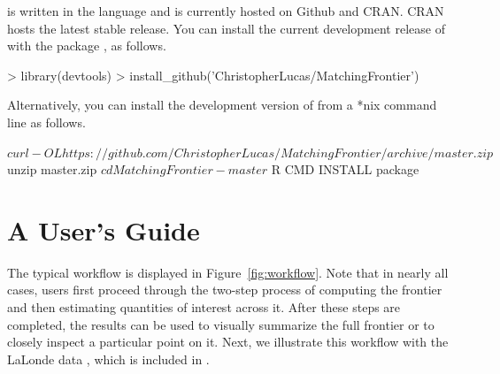 \documentclass[nojss]{jss}
\begin{document}
 is written in the  language
\citep{r2012} and is currently hosted on Github and CRAN. CRAN hosts
the latest stable release. You can install the current development
release of  with the  package
\citep{wickham2013}, as follows.

\begin{Schunk}
\begin{Sinput}
> library(devtools) 
> install_github('ChristopherLucas/MatchingFrontier')
\end{Sinput}
\end{Schunk}

Alternatively, you can install the development version of
 from a *nix command line as follows.

\begin{Schunk}
\begin{Soutput}
 $ curl -OL https://github.com/ChristopherLucas/MatchingFrontier/archive/master.zip
 $ unzip master.zip
 $ cd MatchingFrontier-master
 $ R CMD INSTALL package
\end{Soutput}
\end{Schunk}

\section[A User's Guide]{A User's Guide}

The typical  workflow is displayed in
Figure~\ref{fig:workflow}. Note that in nearly all cases, users first
proceed through the two-step process of computing the frontier and
then estimating quantities of interest across it. After these steps
are completed, the results can be used to visually summarize the full
frontier or to closely inspect a particular point on it.  Next, we
illustrate this workflow with the LaLonde data
\citep{lalonde1986,dehejia1999}, which is included in
.
\end{document}
